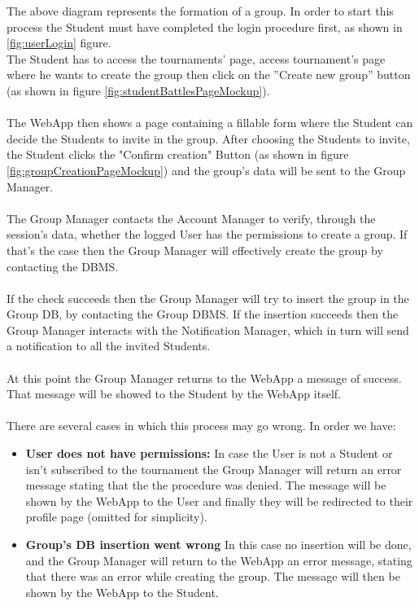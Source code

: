 \documentclass{article}
\begin{document}
{        
        The above diagram represents the formation of a group.
        In order to start this process the Student must have completed the login 
        procedure first, as shown in \ref{fig:userLogin} figure.\\  
        The Student has to access the tournaments' page, access 
        tournament's page where he wants to create the group then 
        click on the ”Create new group” button (as shown in figure \ref{fig:studentBattlesPageMockup}).
        \\ \\
        The WebApp then shows a page containing a fillable form where the Student can decide the Students to
        invite in the group. After choosing the Students to invite, the Student 
        clicks the "Confirm creation" Button (as shown in figure \ref{fig:groupCreationPageMockup}) and the group's data 
        will be sent to the Group Manager.
        \\ \\
        The Group Manager contacts the Account Manager to verify, through
        the session's data, whether the logged User has the permissions to create
        a group. If that's the case then the Group Manager will effectively create
        the group by contacting the DBMS.
        \\ \\
        If the check succeeds then the Group Manager will try to insert the group
        in the Group DB, by contacting the Group DBMS.
        If the insertion succeeds then the Group Manager interacts with the 
        Notification Manager, which in turn will send a notification to all the invited
        Students.
        \\ \\
        At this point the Group Manager returns to the WebApp a message of success. That message
        will be showed to the Student by the WebApp itself.
        \\ \\
        There are several cases in which this process may go wrong. In order we have:
        \begin{itemize}
            \item \textbf{User does not have permissions:} In case the User is not a Student
            or isn't subscribed to the tournament the Group Manager will return an error message 
            stating that the the procedure was denied. The message will be shown 
            by the WebApp to the User and finally they will be
            redirected to their profile page (omitted for simplicity).
            \item \textbf{Group's DB insertion went wrong} In this case no insertion will
            be done, and the Group Manager will return to the WebApp 
            an error message, stating that there was an error while creating the group. 
            The message will then be shown by the WebApp to the Student.
        \end{itemize}


}
\end{document}
